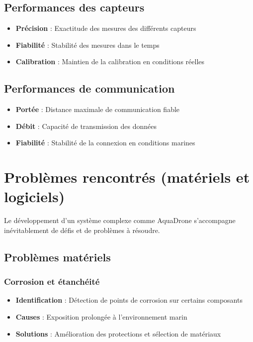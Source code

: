 {\subsection{Performances des capteurs}
\begin{itemize}
    \item \textbf{Précision} : Exactitude des mesures des différents capteurs
    \item \textbf{Fiabilité} : Stabilité des mesures dans le temps
    \item \textbf{Calibration} : Maintien de la calibration en conditions réelles
\end{itemize}

\subsection{Performances de communication}
\begin{itemize}
    \item \textbf{Portée} : Distance maximale de communication fiable
    \item \textbf{Débit} : Capacité de transmission des données
    \item \textbf{Fiabilité} : Stabilité de la connexion en conditions marines
\end{itemize}

\section{Problèmes rencontrés (matériels et logiciels)}
Le développement d'un système complexe comme AquaDrone s'accompagne inévitablement de défis et de problèmes à résoudre.

\subsection{Problèmes matériels}
\subsubsection{Corrosion et étanchéité}
\begin{itemize}
    \item \textbf{Identification} : Détection de points de corrosion sur certains composants
    \item \textbf{Causes} : Exposition prolongée à l'environnement marin
    \item \textbf{Solutions} : Amélioration des protections et sélection de matériaux
\end{itemize}

}
